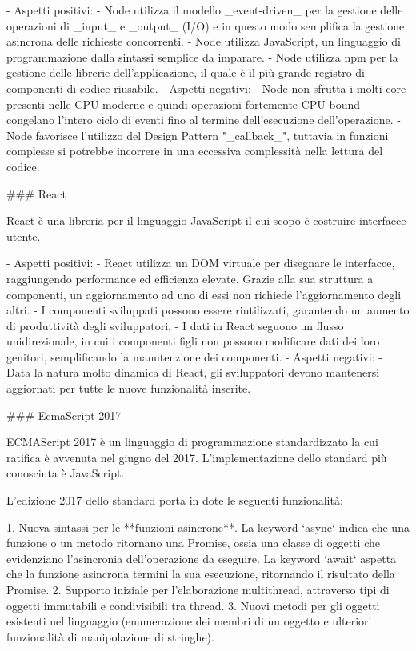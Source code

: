 -   Aspetti positivi:
    -   Node utilizza il modello _event-driven_ per la gestione delle operazioni di _input_ e _output_ (I/O) e in questo modo semplifica la gestione asincrona delle richieste concorrenti.
    -   Node utilizza JavaScript, un linguaggio di programmazione dalla sintassi semplice da imparare.
    -   Node utilizza npm per la gestione delle librerie dell'applicazione, il quale è il più grande registro di componenti di codice riusabile.
-   Aspetti negativi:
    -   Node non sfrutta i molti core presenti nelle CPU moderne e quindi operazioni fortemente CPU-bound congelano l'intero ciclo di eventi fino al termine dell'esecuzione dell'operazione.
    -   Node favorisce l'utilizzo del Design Pattern "_callback_", tuttavia in funzioni complesse si potrebbe incorrere in una eccessiva complessità nella lettura del codice.


### React

React è una libreria per il linguaggio JavaScript il cui scopo è costruire interfacce utente.

-   Aspetti positivi:
    -   React utilizza un DOM virtuale per disegnare le interfacce, raggiungendo performance ed efficienza elevate. Grazie alla sua struttura a componenti, un aggiornamento ad uno di essi non richiede l'aggiornamento degli altri.
    -   I componenti sviluppati possono essere riutilizzati, garantendo un aumento di produttività degli sviluppatori.
    -   I dati in React seguono un flusso unidirezionale, in cui i componenti figli non possono modificare dati dei loro genitori, semplificando la manutenzione dei componenti.
-   Aspetti negativi:
    -   Data la natura molto dinamica di React, gli sviluppatori devono mantenersi aggiornati per tutte le nuove funzionalità inserite.


### EcmaScript 2017

ECMAScript 2017 è un linguaggio di programmazione standardizzato la cui ratifica è avvenuta nel giugno del 2017. L'implementazione dello standard più conosciuta è JavaScript.

L'edizione 2017 dello standard porta in dote le seguenti funzionalità:

1.  Nuova sintassi per le **funzioni asincrone**. La keyword `async` indica che una funzione o un metodo ritornano una Promise, ossia una classe di oggetti che evidenziano l'asincronia dell'operazione da eseguire. La keyword `await` aspetta che la funzione asincrona termini la sua esecuzione, ritornando il risultato della Promise.
2.  Supporto iniziale per l'elaborazione multithread, attraverso tipi di oggetti immutabili e condivisibili tra thread.
3.  Nuovi metodi per gli oggetti esistenti nel linguaggio (enumerazione dei membri di un oggetto e ulteriori funzionalità di manipolazione di stringhe).


